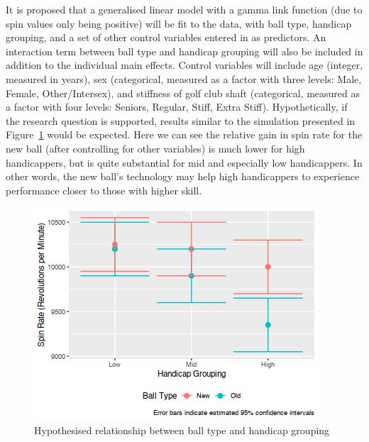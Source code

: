 \documentclass{article}
\begin{document}
It is proposed that a generalised linear model with a gamma link function (due to spin values only being positive) will be fit to the data, with ball type, handicap grouping, and a set of other control variables entered in as predictors. 
An interaction term between ball type and handicap grouping will also be included in addition to the individual main effects. 
Control variables will include age (integer, measured in years), sex (categorical, measured as a factor with three levels: Male, Female, Other/Intersex), and stiffness of golf club shaft (categorical, measured as a factor with four levels: Seniors, Regular, Stiff, Extra Stiff). 
Hypothetically, if the research question is supported, results similar to the simulation presented in Figure~\ref{fig:expectations} would be expected.
Here we can see the relative gain in spin rate for the new ball (after controlling for other variables) is much lower for high handicappers, but is quite substantial for mid and especially low handicappers. 
In other words, the new ball's technology may help high handicappers to experience performance closer to those with higher skill.

\begin{figure}[h]
    \centering
    \includegraphics[max width=\linewidth, scale=0.53]{expectations}
    \caption{\label{fig:expectations}Hypothesised relationship between ball type and handicap grouping}
\end{figure}
\end{document}
